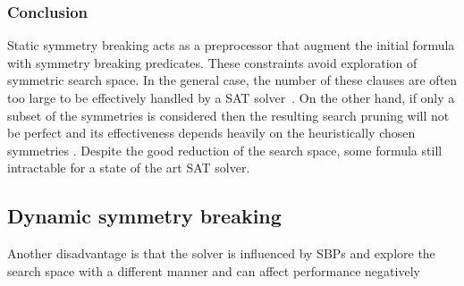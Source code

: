 %
%
%
%
%




\subsubsection{Conclusion}

Static symmetry breaking acts as a preprocessor that augment the initial formula with
symmetry breaking predicates. These constraints avoid exploration of symmetric search space.
In the general case, the number of these clauses are often too large to be
effectively handled by a SAT solver~\cite{Luks2004}. 
On the other hand, if only a subset of the symmetries is considered then the resulting search pruning
will not be perfect and its effectiveness depends heavily on the
heuristically chosen symmetries \cite{biere2009handbook}.
Despite the good reduction of the search space, some formula still intractable for a 
state of the art SAT solver.


%	




\subsection{Dynamic symmetry breaking}


Another disadvantage is that the solver is influenced by SBPs and explore the search space with a different 
manner and can affect performance negatively 

